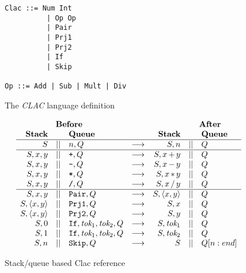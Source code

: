 \documentclass{acm_proc_article-sp}
\newcommand{\clac}{{\em CLAC} language }
\begin{document}
\begin{figure}
\centering
\begin{BVerbatim}
Clac ::= Num Int
          | Op Op
          | Pair
          | Prj1
          | Prj2
          | If
          | Skip

Op ::= Add | Sub | Mult | Div
\end{BVerbatim}
\caption{The \clac definition}
\end{figure}

\begin{figure}
{\small
\[
\begin{array}{rclcrcll}
\multicolumn{3}{c}{\bf Before ~~}  & & \multicolumn{3}{c}{\bf \qquad\quad~~ After} \\ 
\mbox{\bf Stack} & & \mbox{\bf Queue} & & \mbox{\bf Stack} & & {\bf Queue} \\ \hline
S            & \mid\mid & n, Q & \longrightarrow &
S, n         & \mid\mid & Q
\\ \hline
S, x, y      & \mid\mid & \mbox{\texttt{+}}, Q & \longrightarrow & 
S, x\,{+}\,y & \mid\mid & Q
\\
S, x, y      & \mid\mid & \mbox{\texttt{-}}, Q & \longrightarrow & 
S, x\,{-}\,y & \mid\mid & Q
\\
S, x, y      & \mid\mid & \mbox{\texttt{*}}, Q & \longrightarrow & 
S, x\,{*}\,y & \mid\mid & Q
\\
S, x, y      & \mid\mid & \mbox{\texttt{/}}, Q & \longrightarrow & 
S, x\,{/}\,y & \mid\mid & Q
\\ \hline
S, x, y         & \mid\mid & \texttt{Pair}, Q & \longrightarrow & S, \langle x, y\rangle & \mid\mid & Q
\\
S, \langle x, y\rangle         & \mid\mid & \texttt{Prj1}, Q & \longrightarrow & S, x & \mid\mid & Q
\\
S, \langle x, y\rangle         & \mid\mid & \texttt{Prj2}, Q & \longrightarrow & S, y & \mid\mid & Q
\\
S, 0 & \mid\mid & \texttt{If}, \textit{tok}_1, \textit{tok}_2, Q & \longrightarrow & S, \textit{tok}_1 & \mid\mid & Q
\\
S, 1 & \mid\mid & \texttt{If}, \textit{tok}_1, \textit{tok}_2, Q & \longrightarrow & S, \textit{tok}_2 & \mid\mid & Q
\\
S, n         & \mid\mid & \texttt{Skip}, Q & \longrightarrow & S & \mid\mid & Q[n:end]
\end{array}
\]}
\caption{Stack/queue based Clac reference}
\end{figure}
\end{document}
